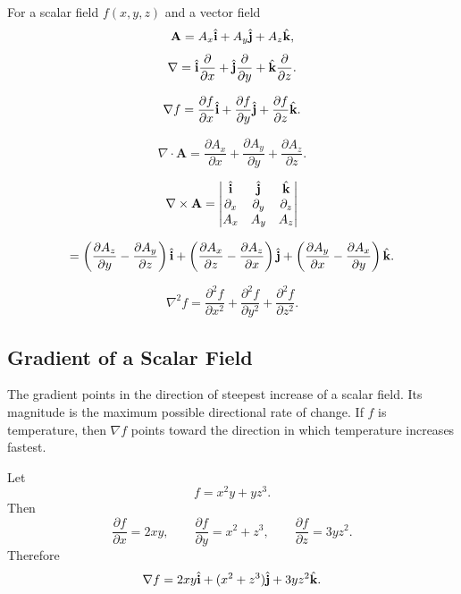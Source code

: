 \documentclass{otscience}
\begin{document}
\begin{formulaboxnosplit}
    For a scalar field \(f(x,y,z)\) and a vector field
    \[
        \mathbf{A}=A_x\hat{\mathbf{i}}+A_y\hat{\mathbf{j}}+A_z\hat{\mathbf{k}},
    \]
    \[
        \nabla=\hat{\mathbf{i}}\frac{\partial}{\partial x}+\hat{\mathbf{j}}\frac{\partial}{\partial y}+\hat{\mathbf{k}}\frac{\partial}{\partial z}.
    \]

    \[
        \nabla f=\frac{\partial f}{\partial x}\hat{\mathbf{i}}+\frac{\partial f}{\partial y}\hat{\mathbf{j}}+\frac{\partial f}{\partial z}\hat{\mathbf{k}}.
    \]

    \[
        \nabla\cdot\mathbf{A}=\frac{\partial A_x}{\partial x}+\frac{\partial A_y}{\partial y}+\frac{\partial A_z}{\partial z}.
    \]

    \[
        \nabla\times\mathbf{A}=\begin{vmatrix}
            \hat{\mathbf{i}}      & \hat{\mathbf{j}}      & \hat{\mathbf{k}}      \\
            \partial_x & \partial_y & \partial_z \\
            A_x        & A_y        & A_z
        \end{vmatrix}
    \]

    \[
        =\left(\frac{\partial A_z}{\partial y}-\frac{\partial A_y}{\partial z}\right)\hat{\mathbf{i}}
        +\left(\frac{\partial A_x}{\partial z}-\frac{\partial A_z}{\partial x}\right)\hat{\mathbf{j}}
        +\left(\frac{\partial A_y}{\partial x}-\frac{\partial A_x}{\partial y}\right)\hat{\mathbf{k}}.
    \]

    \[
        \nabla^2 f=\frac{\partial^2 f}{\partial x^2}+\frac{\partial^2 f}{\partial y^2}+\frac{\partial^2 f}{\partial z^2}.
    \]
\end{formulaboxnosplit}

\subsection{Gradient of a Scalar Field}

The gradient points in the direction of steepest increase of a scalar field. Its magnitude is the maximum possible directional rate of change. If \(f\) is temperature, then \(\nabla f\) points toward the direction in which temperature increases fastest.

\begin{exampleboxnosplit}
    Let
    \[
        f=x^2y+yz^3.
    \]
    Then
    \[
        \frac{\partial f}{\partial x}=2xy,\qquad
        \frac{\partial f}{\partial y}=x^2+z^3,\qquad
        \frac{\partial f}{\partial z}=3yz^2.
    \]
    Therefore
    \[
        \nabla f=2xy\hat{\mathbf{i}}+(x^2+z^3)\hat{\mathbf{j}}+3yz^2\hat{\mathbf{k}}.
    \]
\end{exampleboxnosplit}
\end{document}
